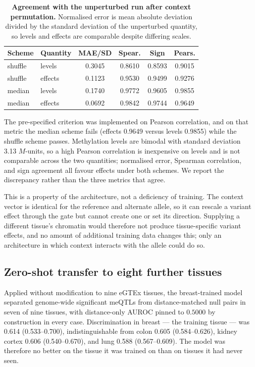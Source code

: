 \documentclass[10pt,letterpaper,twocolumn]{article}
\begin{document}
\begin{table}[!tbp]
\centering
\small
\caption{\textbf{Agreement with the unperturbed run after context permutation.}
Normalised error is mean absolute deviation divided by the standard deviation of
the unperturbed quantity, so levels and effects are comparable despite differing
scales.}
\label{tab:ctxperm}
\setlength{\tabcolsep}{4pt}
\begin{tabular}{llcccc}
\hline
Scheme & Quantity & MAE/SD & Spear. & Sign & Pears. \\
\hline
shuffle & levels  & 0.3045 & 0.8610 & 0.8593 & 0.9015 \\
shuffle & effects & 0.1123 & 0.9530 & 0.9499 & 0.9276 \\
median  & levels  & 0.1740 & 0.9772 & 0.9605 & 0.9855 \\
median  & effects & 0.0692 & 0.9842 & 0.9744 & 0.9649 \\
\hline
\end{tabular}
\end{table}

The pre-specified criterion was implemented on Pearson correlation, and on that
metric the median scheme fails (effects 0.9649 versus levels 0.9855) while the
shuffle scheme passes. Methylation levels are bimodal with standard deviation
3.13 $M$-units, so a high Pearson correlation is inexpensive on levels and is
not comparable across the two quantities; normalised error, Spearman
correlation, and sign agreement all favour effects under both schemes. We report
the discrepancy rather than the three metrics that agree.

This is a property of the architecture, not a deficiency of training. The
context vector is identical for the reference and alternate allele, so it can
rescale a variant effect through the gate but cannot create one or set its
direction. Supplying a different tissue's chromatin would therefore not produce
tissue-specific variant effects, and no amount of additional training data
changes this; only an architecture in which context interacts with the allele
could do so.

\subsection{Zero-shot transfer to eight further tissues}
\label{sec:transfer}

Applied without modification to nine eGTEx tissues, the breast-trained model
separated genome-wide significant meQTLs from distance-matched null pairs in
seven of nine tissues, with distance-only AUROC pinned to $0.5000$ by
construction in every case. Discrimination in breast --- the training tissue ---
was 0.614 (0.533--0.700), indistinguishable from colon 0.605 (0.584--0.626),
kidney cortex 0.606 (0.540--0.670), and lung 0.588 (0.567--0.609). The model was
therefore no better on the tissue it was trained on than on tissues it had never
seen.
\end{document}
